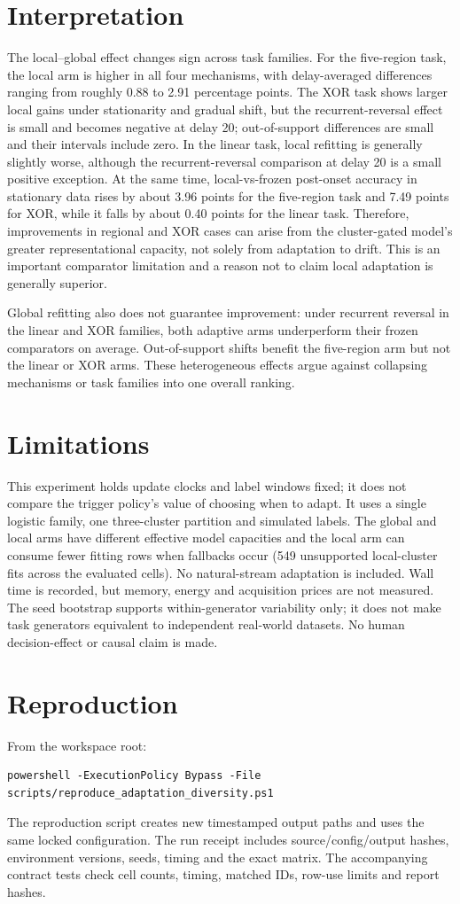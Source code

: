 \documentclass[10pt]{article}
\begin{document}
\section{Interpretation}
The local--global effect changes sign across task families. For the five-region task, the local arm is higher in all four mechanisms, with delay-averaged differences ranging from roughly 0.88 to 2.91 percentage points. The XOR task shows larger local gains under stationarity and gradual shift, but the recurrent-reversal effect is small and becomes negative at delay 20; out-of-support differences are small and their intervals include zero. In the linear task, local refitting is generally slightly worse, although the recurrent-reversal comparison at delay 20 is a small positive exception. At the same time, local-vs-frozen post-onset accuracy in stationary data rises by about 3.96 points for the five-region task and 7.49 points for XOR, while it falls by about 0.40 points for the linear task. Therefore, improvements in regional and XOR cases can arise from the cluster-gated model's greater representational capacity, not solely from adaptation to drift. This is an important comparator limitation and a reason not to claim local adaptation is generally superior.

Global refitting also does not guarantee improvement: under recurrent reversal in the linear and XOR families, both adaptive arms underperform their frozen comparators on average. Out-of-support shifts benefit the five-region arm but not the linear or XOR arms. These heterogeneous effects argue against collapsing mechanisms or task families into one overall ranking.
\section{Limitations}
This experiment holds update clocks and label windows fixed; it does not compare the trigger policy's value of choosing when to adapt. It uses a single logistic family, one three-cluster partition and simulated labels. The global and local arms have different effective model capacities and the local arm can consume fewer fitting rows when fallbacks occur (549 unsupported local-cluster fits across the evaluated cells). No natural-stream adaptation is included. Wall time is recorded, but memory, energy and acquisition prices are not measured. The seed bootstrap supports within-generator variability only; it does not make task generators equivalent to independent real-world datasets. No human decision-effect or causal claim is made.
\section{Reproduction}
From the workspace root:
\begin{verbatim}
powershell -ExecutionPolicy Bypass -File scripts/reproduce_adaptation_diversity.ps1
\end{verbatim}
The reproduction script creates new timestamped output paths and uses the same locked configuration. The run receipt includes source/config/output hashes, environment versions, seeds, timing and the exact matrix. The accompanying contract tests check cell counts, timing, matched IDs, row-use limits and report hashes.
\end{document}
